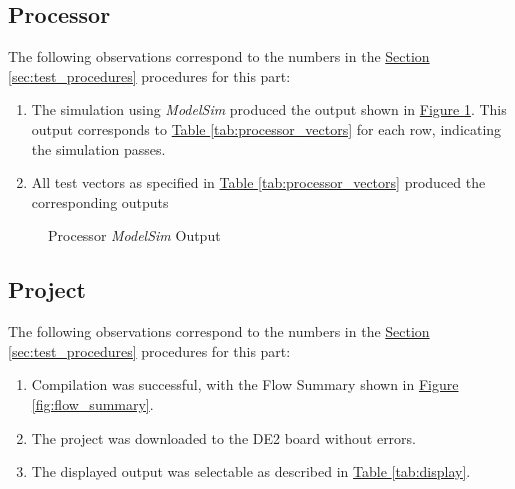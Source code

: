 \FloatBarrier \subsection{Processor} %
\label{sub:processor} \FloatBarrier

The following observations correspond to the numbers in the \hyperref[sec:test_procedures]{Section \ref*{sec:test_procedures}} procedures for this part:

\begin{enumerate}
    \item The simulation using \emph{ModelSim} produced the output shown in \hyperref[fig:processor_output]{Figure \ref*{fig:processor_output}}.
    This output corresponds to \hyperref[tab:processor_vectors]{Table \ref*{tab:processor_vectors}} for each row, indicating the simulation passes.
    \item All test vectors as specified in \hyperref[tab:processor_vectors]{Table \ref*{tab:processor_vectors}} produced the corresponding outputs
\end{enumerate}

\begin{figure}
    \caption{Processor \emph{ModelSim} Output\label{fig:processor_output}}
\end{figure}


\FloatBarrier \subsection{Project} %
\label{sub:projects} \FloatBarrier

The following observations correspond to the numbers in the \hyperref[sec:test_procedures]{Section \ref*{sec:test_procedures}} procedures for this part:

\begin{enumerate}
    \item Compilation was successful, with the Flow Summary shown in \hyperref[fig:flow_summary]{Figure \ref*{fig:flow_summary}}.
    \item The project was downloaded to the DE2 board without errors.
    \item The displayed output was selectable as described in \hyperref[tab:display]{Table \ref*{tab:display}}.
\end{enumerate}

